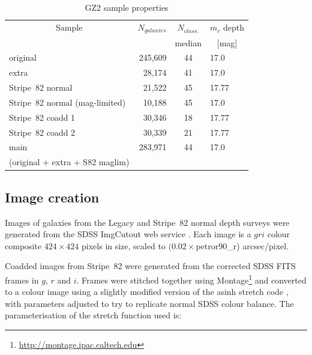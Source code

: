 \documentclass[useAMS,usenatbib]{mn2e}
\begin{document}
\begin{table}
 \caption{GZ2 sample properties \label{tbl-sample}}
 \begin{tabular}{@{}lrcl}
 \hline
\multicolumn{1}{c}{Sample} &
\multicolumn{1}{c}{$N_{galaxies}$} &
\multicolumn{1}{c}{$N_{class.}$} &
\multicolumn{1}{c}{$m_r$ depth} 
\\ 
\multicolumn{1}{c}{} &
\multicolumn{1}{c}{} &
\multicolumn{1}{c}{median} &
\multicolumn{1}{c}{[mag]} 
\\ 
\hline
\hline						%
original                       & 245,609 & 44  & 17.0   \\     %
extra                          &  28,174 & 41  & 17.0   \\     %
Stripe~82 normal               &  21,522 & 45  & 17.77  \\     %
Stripe~82 normal (mag-limited) &  10,188 & 45  & 17.0   \\     %
Stripe~82 coadd 1              &  30,346 & 18  & 17.77  \\     %
Stripe~82 coadd 2              &  30,339 & 21  & 17.77  \\     %
\hline
main                           & 283,971 & 44  & 17.0   \\     %
(original + extra + S82 maglim)& \\
\hline
 \end{tabular}
\end{table}

\subsection{Image creation}\label{ssec-imagecreation}

Images of galaxies from the Legacy and Stripe~82 normal depth surveys were generated from the SDSS ImgCutout web service \citep{nie04}. Each image is a $gri$ colour composite $424\times424$ pixels in size, scaled to $(0.02\times$petror90\_r) arcsec/pixel.

Coadded images from Stripe~82 were generated from the corrected SDSS FITS frames in $g$, $r$ and $i$. Frames were stitched together using Montage\footnote{\url{http://montage.ipac.caltech.edu}} and converted to a colour image using a slightly modified version of the asinh stretch code \citep{lup04}, with parameters adjusted to try to replicate normal SDSS colour balance. The parameterisation of the stretch function used is:
\end{document}
